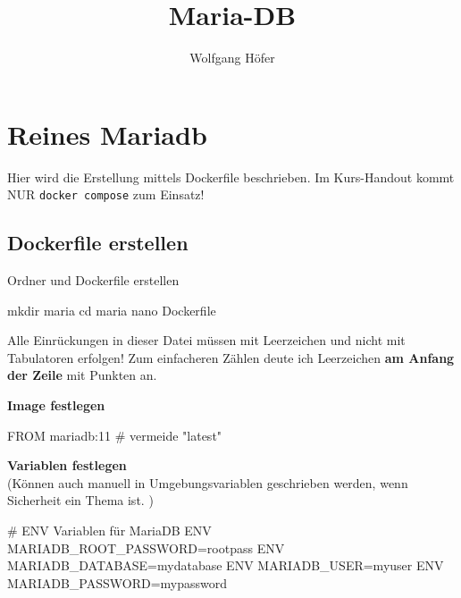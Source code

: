 \documentclass[
  ngerman,
  letterpaper,
  DIV=11]{scrreprt}
\title{Maria-DB}
\author{Wolfgang Höfer}
\date{}
\newenvironment{Shaded}{\begin{snugshade}}{\end{snugshade}}
\newcommand{\BuiltInTok}[1]{\textcolor[rgb]{0.00,0.23,0.31}{#1}}
\newcommand{\CommentTok}[1]{\textcolor[rgb]{0.37,0.37,0.37}{#1}}
\newcommand{\ExtensionTok}[1]{\textcolor[rgb]{0.00,0.23,0.31}{#1}}
\newcommand{\FunctionTok}[1]{\textcolor[rgb]{0.28,0.35,0.67}{#1}}
\newcommand{\NormalTok}[1]{\textcolor[rgb]{0.00,0.23,0.31}{#1}}
\begin{document}
\maketitle


\setcounter{anr}{1}

\section{Reines Mariadb}\label{reines-mariadb}

Hier wird die Erstellung mittels Dockerfile beschrieben. Im Kurs-Handout
kommt NUR \texttt{docker\ compose} zum Einsatz!

\subsection{Dockerfile erstellen}\label{dockerfile-erstellen}

Ordner und Dockerfile erstellen

\begin{Shaded}
\begin{Highlighting}[]
\FunctionTok{mkdir}\NormalTok{ maria}
\BuiltInTok{cd}\NormalTok{ maria}
\FunctionTok{nano}\NormalTok{ Dockerfile}
\end{Highlighting}
\end{Shaded}

Alle Einrückungen in dieser Datei müssen mit Leerzeichen und nicht mit
Tabulatoren erfolgen! Zum einfacheren Zählen deute ich Leerzeichen
\textbf{am Anfang der Zeile} mit Punkten an.

\textbf{Image festlegen}

\begin{Shaded}
\begin{Highlighting}[]
\ExtensionTok{FROM}\NormalTok{ mariadb:11   }\CommentTok{\# vermeide "latest"}
\end{Highlighting}
\end{Shaded}

\textbf{Variablen festlegen}\\
(Können auch manuell in Umgebungsvariablen geschrieben werden, wenn
Sicherheit ein Thema ist. )

\begin{Shaded}
\begin{Highlighting}[]
\CommentTok{\# ENV Variablen für MariaDB}
\ExtensionTok{ENV}\NormalTok{ MARIADB\_ROOT\_PASSWORD=rootpass}
\ExtensionTok{ENV}\NormalTok{ MARIADB\_DATABASE=mydatabase}
\ExtensionTok{ENV}\NormalTok{ MARIADB\_USER=myuser}
\ExtensionTok{ENV}\NormalTok{ MARIADB\_PASSWORD=mypassword}
\end{Highlighting}
\end{Shaded}
\end{document}
